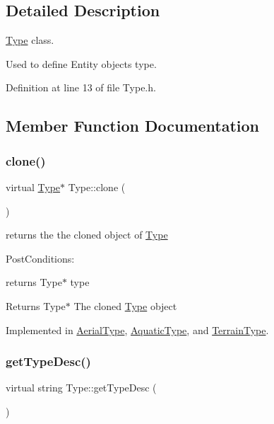 \subsection{Detailed Description}
\hyperlink{classType}{Type} class. 

Used to define Entity objects type. 

Definition at line 13 of file Type.\+h.



\subsection{Member Function Documentation}
\mbox{\label{classType_a7b79d264e2cbac9c091cdb41ffb112c9}} 
\subsubsection{\texorpdfstring{clone()}{clone()}}
{\footnotesize\ttfamily virtual \hyperlink{classType}{Type}$\ast$ Type\+::clone (\begin{DoxyParamCaption}{ }\end{DoxyParamCaption})\hspace{0.3cm}{\ttfamily [pure virtual]}}



returns the the cloned object of \hyperlink{classType}{Type} 

Post\+Conditions\+:
\begin{DoxyItemize}
\item returns Type$\ast$ type
\end{DoxyItemize}

\begin{DoxyReturn}{Returns}
Type$\ast$ The cloned \hyperlink{classType}{Type} object 
\end{DoxyReturn}


Implemented in \hyperlink{classAerialType_a8e7184b0b9e184142144df65f3da7fb1}{Aerial\+Type}, \hyperlink{classAquaticType_afbcc6f679b6108c7ed286ab0aa91bdd5}{Aquatic\+Type}, and \hyperlink{classTerrainType_aa2c54fdc07981dab3941f28221e22655}{Terrain\+Type}.

\mbox{\label{classType_a5c453300dc060252c30534110bd2f78c}} 
\subsubsection{\texorpdfstring{get\+Type\+Desc()}{getTypeDesc()}}
{\footnotesize\ttfamily virtual string Type\+::get\+Type\+Desc (\begin{DoxyParamCaption}{ }\end{DoxyParamCaption})\hspace{0.3cm}{\ttfamily [pure virtual]}}




